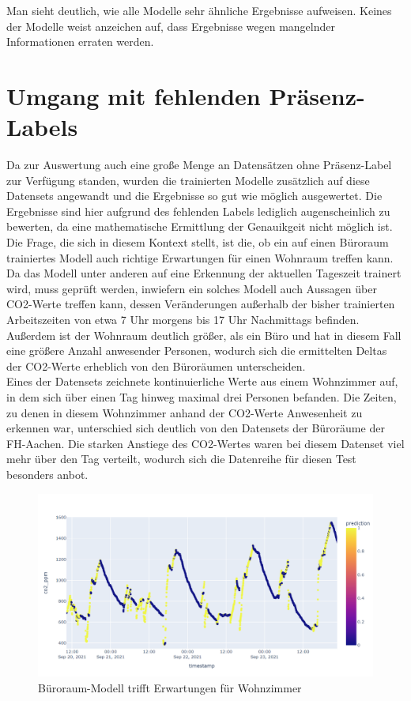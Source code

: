 Man sieht deutlich, wie alle Modelle sehr ähnliche Ergebnisse aufweisen. Keines der Modelle weist anzeichen 
auf, dass Ergebnisse wegen mangelnder Informationen erraten werden.

\section{Umgang mit fehlenden Präsenz-Labels}
Da zur Auswertung auch eine große Menge an Datensätzen ohne Präsenz-Label zur Verfügung standen, wurden die trainierten
Modelle zusätzlich auf diese Datensets angewandt und die Ergebnisse so gut wie möglich ausgewertet. Die Ergebnisse
sind hier aufgrund des fehlenden Labels lediglich augenscheinlich zu bewerten, da eine mathematische Ermittlung
der Genauikgeit nicht möglich ist.\\
Die Frage, die sich in diesem Kontext stellt, ist die, ob ein auf einen Büroraum trainiertes Modell auch richtige
Erwartungen für einen Wohnraum treffen kann.
Da das Modell unter anderen auf eine Erkennung der aktuellen Tageszeit trainert wird, muss geprüft
werden, inwiefern ein solches Modell auch Aussagen über CO2-Werte treffen kann, dessen Veränderungen außerhalb
der bisher trainierten Arbeitszeiten von etwa 7 Uhr morgens bis 17 Uhr Nachmittags befinden. 
Außerdem ist der Wohnraum deutlich größer, als ein Büro und hat in diesem Fall eine größere Anzahl anwesender
Personen, wodurch sich die ermittelten Deltas der CO2-Werte erheblich von den Büroräumen unterscheiden.\\
Eines der Datensets zeichnete kontinuierliche Werte aus einem Wohnzimmer auf, in dem sich über einen 
Tag hinweg maximal drei Personen befanden. Die Zeiten, zu denen in diesem Wohnzimmer anhand der CO2-Werte
Anwesenheit zu erkennen war, unterschied sich deutlich von den Datensets der Büroräume der FH-Aachen. Die 
starken Anstiege des CO2-Wertes waren bei diesem Datenset viel mehr über den Tag verteilt, wodurch sich die 
Datenreihe für diesen Test besonders anbot.

\begin{figure}[h]
    \centering
    \includegraphics[width=1.0\textwidth]{pic/h217_predicting_livingroom.png}
    \caption{Büroraum-Modell trifft Erwartungen für Wohnzimmer}
    \label{fig:PT_eval}
\end{figure}

